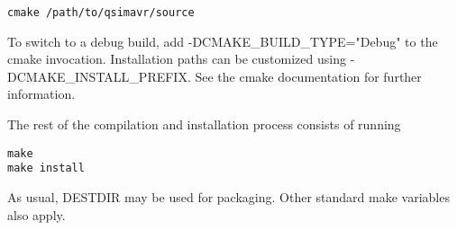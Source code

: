 \begin{verbatim}
cmake /path/to/qsimavr/source
\end{verbatim}

To switch to a debug build, add -DCMAKE\_BUILD\_TYPE="Debug" to the cmake
invocation. Installation paths can be customized using -DCMAKE\_INSTALL\_PREFIX.
See the cmake documentation for further information.

The rest of the compilation and installation process consists of running

\begin{verbatim}
make
make install
\end{verbatim}

As usual, DESTDIR may be used for packaging. Other standard make variables also
apply.

